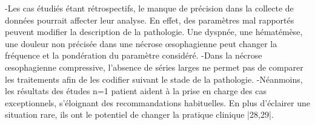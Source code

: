 \documentclass[./discussion]{subfiles}
\begin{document}
-Les cas étudiés étant rétrospectifs, le manque de précision dans la collecte de données pourrait affecter leur analyse. En effet, des paramètres mal rapportés peuvent modifier la description de la pathologie. Une dyspnée, une hématémèse, une douleur non précisée dans une nécrose œsophagienne peut changer la fréquence et la pondération du paramètre considéré.
-Dans la nécrose œsophagienne compressive, l’absence de séries larges ne permet pas de comparer les traitements afin de les codifier suivant le stade de la pathologie.
-Néanmoins, les résultats des études n=1 patient aident à la prise en charge des cas exceptionnels, s’éloignant des recommandations habituelles. En plus d’éclairer une situation rare, ils ont le potentiel de changer la pratique clinique |28,29|.
\end{document}
